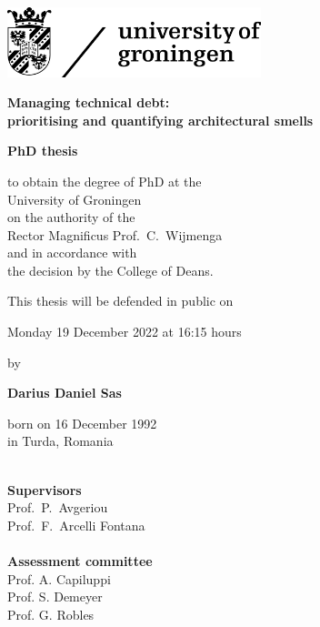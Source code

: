 \pagestyle{empty}
\thispagestyle{empty}
\large
\vspace*{-2cm}

\hspace*{-0.5cm}\includegraphics[width=7.38cm]{Figures/rugr_logoen_zwart_rgb.jpg}

\begin{center}

\vspace{1cm}

{\fontsize{25pt}{30pt}\selectfont \textbf{Managing technical debt:}\\\textbf{prioritising and quantifying architectural smells}}


\vspace{2.5cm}

\textbf{\Large{PhD thesis}}

\vspace{1.6cm}

to obtain the degree of PhD at the\\
University of Groningen\\
on the authority of the\\
Rector Magnificus Prof.\ C.~Wijmenga\\
and in accordance with\\
the decision by the College of Deans.

\vspace{0.4cm}

This thesis will be defended in public on

\vspace{0.4cm}

Monday 19 December 2022 at 16:15 hours

\vspace{1cm}

by

\vspace{1cm}

\textbf{\Large{Darius Daniel Sas}}\\

\vspace{0.4cm}

born on 16 December 1992\\
in Turda, Romania
\end{center}
\enlargethispage{\baselineskip}

\restoregeometry
\clearpage
\thispagestyle{empty}
\noindent
\\
\textbf{Supervisors}\\
Prof.\ P.\ Avgeriou\\
Prof.\ F.\ Arcelli Fontana\\

\noindent
\\
\textbf{Assessment committee}\\
Prof. A. Capiluppi\\
Prof. S. Demeyer\\
Prof. G. Robles\\

\vfill
\normalsize
